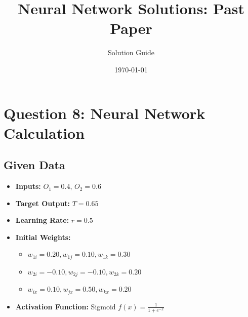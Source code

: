 \documentclass{article}
\title{\textbf{Neural Network Solutions: Past Paper}}
\author{Solution Guide}
\date{\today}
\begin{document}
\maketitle

\section*{Question 8: Neural Network Calculation}

\subsection*{Given Data}
\begin{itemize}
    \item \textbf{Inputs:} $O_1 = 0.4$, $O_2 = 0.6$
    \item \textbf{Target Output:} $T = 0.65$
    \item \textbf{Learning Rate:} $r = 0.5$
    \item \textbf{Initial Weights:}
    \begin{itemize}
        \item $w_{1i} = 0.20, w_{1j} = 0.10, w_{1k} = 0.30$
        \item $w_{2i} = -0.10, w_{2j} = -0.10, w_{2k} = 0.20$
        \item $w_{ix} = 0.10, w_{jx} = 0.50, w_{kx} = 0.20$
    \end{itemize}
    \item \textbf{Activation Function:} Sigmoid $f(x) = \frac{1}{1 + e^{-x}}$
\end{itemize}
\end{document}
